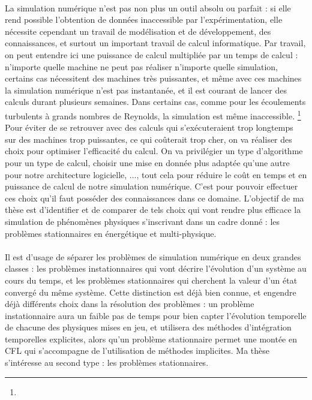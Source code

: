 	\paragraph{}
	La simulation numérique n'est pas non plus un outil absolu ou parfait : si elle rend possible l'obtention de données inaccessible par l'expérimentation, elle nécessite cependant un travail de modélisation et de développement, des connaissances, et surtout un important travail de calcul informatique.
	Par travail, on peut entendre ici une puissance de calcul multipliée par un temps de calcul : n'importe quelle machine ne peut pas réaliser n'importe quelle simulation, certains cas nécessitent des machines très puissantes, et même avec ces machines la simulation numérique n'est pas instantanée, et il est courant de lancer des calculs durant plusieurs semaines.
	Dans certains cas, comme pour les écoulements turbulents à grands nombres de Reynolds, la simulation est même inaccessible.
	\footnote{}
	Pour éviter de se retrouver avec des calculs qui s'exécuteraient trop longtemps sur des machines trop puissantes, ce qui coûterait trop cher, on va réaliser des choix pour optimiser l'efficacité du calcul.
	On va privilégier un type d'algorithme pour un type de calcul, choisir une mise en donnée plus adaptée qu'une autre pour notre architecture logicielle, ..., tout cela pour réduire le coût en temps et en puissance de calcul de notre simulation numérique.
	C'est pour pouvoir effectuer ces choix qu'il faut posséder des connaissances dans ce domaine.
	L'objectif de ma thèse est d'identifier et de comparer de tels choix qui vont rendre plus efficace la simulation de phénomènes physiques s'inscrivant dans un cadre donné : les problèmes stationnaires en énergétique et multi-physique.

	\paragraph{}
	Il est d'usage de séparer les problèmes de simulation numérique en deux grandes classes : les problèmes instationnaires qui vont décrire l'évolution d'un système au cours du temps, et les problèmes stationnaires qui cherchent la valeur d'un état convergé du même système.
	Cette distinction est déjà bien connue, et engendre déjà différents choix dans la résolution des problèmes : un problème instationnaire aura un faible pas de temps pour bien capter l'évolution temporelle de chacune des physiques mises en jeu, et utilisera des méthodes d'intégration temporelles explicites, alors qu'un problème stationnaire permet une montée en CFL qui s'accompagne de l'utilisation de méthodes implicites.
	Ma thèse s'intéresse au second type : les problèmes stationnaires.


